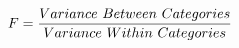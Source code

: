 \documentclass[preview]{standalone}
\begin{document}
\begin{align*}
\special{dvisvgm:raw <g id='unique000'>}F = \frac{Variance\ Between\ Categories}{Variance\ Within\ Categories}\special{dvisvgm:raw </g>}
\end{align*}
\end{document}
